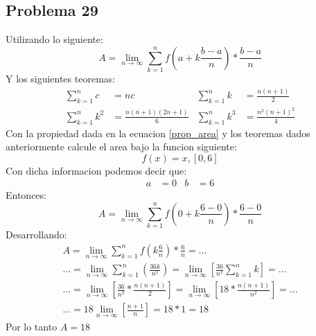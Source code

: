 \documentclass{article}
\begin{document}
      \subsection{Problema 29}
        Utilizando lo siguiente:
        \begin{equation} \label{prop_area}
          A = \lim_{n\to\infty} \sum_{k=1}^{n} f\left(a+k\frac{b-a}{n}\right)* \frac{b-a}{n}
        \end{equation}
        Y los siguientes teoremas:
        \begin{align*}
          \sum_{k=1}^{n} c &= nc & \sum_{k=1}^{n} k &= \frac{n(n+1)}{2} \\ \sum_{k=1}^{n} k^2 &= \frac{n(n+1)(2n+1)}{6} & \sum_{k=1}^{n} k^3 &= \frac{n^2(n+1)^2}{4}
        \end{align*}
        Con la propiedad dada en la ecuacion \ref{prop_area} y los teoremas dados anteriormente calcule el area bajo la funcion siguiente:
        \begin{equation}
          f(x) = x, [0,6]
        \end{equation}
        Con dicha informacion podemos decir que:
        \begin{align*}
          a &= 0 & b &= 6
        \end{align*}
        Entonces:
        \begin{equation}
          A = \lim_{n\to\infty} \sum_{k=1}^{n} f\left(0+k\frac{6-0}{n}\right)* \frac{6-0}{n}
        \end{equation}
        Desarrollando:
        \begin{align*}
          A = \lim_{n\to\infty} \sum_{k=1}^{n} f\left(k\frac{6}{n}\right)* \frac{6}{n} =\dots\\\dots = \lim_{n\to\infty} \sum_{k=1}^{n} \left(\frac{36k}{n^2}\right)=\lim_{n\to\infty}\left[\frac{36}{n^2} \sum_{k=1}^{n} k\right]=\dots \\ \dots = \lim_{n\to\infty}\left[\frac{36}{n^2} *\frac{n(n+1)}{2}\right]=\lim_{n\to\infty} \left[18*\frac{n(n+1)}{n^2}\right]=\dots \\ \dots = 18\lim_{n\to\infty} \left[\frac{n+1}{n}\right]= 18*1=18
        \end{align*}
        Por lo tanto $A = 18$
\end{document}
